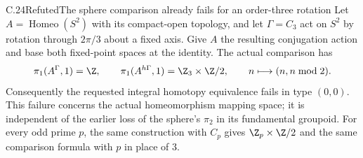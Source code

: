 \begin{claim}{C.24}{Refuted}{The sphere comparison already fails for an order-three rotation}
Let $A=\operatorname{Homeo}(S^2)$ with its compact-open topology, and let
$\Gamma=C_3$ act on $S^2$ by rotation through $2\pi/3$ about a fixed axis.
Give $A$ the resulting conjugation action and base both fixed-point spaces
at the identity. The actual comparison has
\[
 \pi_1(A^\Gamma,1)=\Z,\qquad
 \pi_1(A^{h\Gamma},1)=\Z_3\times\Z/2,
 \qquad n\longmapsto(n,n\bmod2).
\]
Consequently the requested integral homotopy equivalence fails in type
$(0,0)$. This failure concerns the actual homeomorphism mapping space;
it is independent of the earlier loss of the sphere's $\pi_2$ in its
fundamental groupoid. For every odd prime $p$, the same construction with
$C_p$ gives $\Z_p\times\Z/2$ and the same comparison formula with $p$
in place of $3$.
\end{claim}
